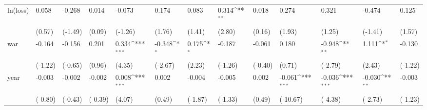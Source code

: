 \def\sym#1{\ifmmode^{#1}\else\(^{#1}\)\fi}
\begin{tabular}{p{1.5cm} p{1.7cm} p{1.7cm} p{1.7cm} p{1.7cm} p{1.7cm} p{1.7cm} p{1.7cm} p{1.7cm} p{1.7cm} p{1.7cm} p{1.7cm} p{1.7cm}}
\hline
ln(loss)        &    0.058         &   -0.268         &    0.014         &   -0.073         &    0.174         &    0.083         &    0.314\sym{**} &    0.018         &    0.274         &    0.321         &   -0.474         &    0.125         \\
                &   (0.57)         &  (-1.49)         &   (0.09)         &  (-1.26)         &   (1.76)         &   (1.41)         &   (2.80)         &   (0.16)         &   (1.93)         &   (1.25)         &  (-1.41)         &   (1.57)         \\
war             &   -0.164         &   -0.156         &    0.201         &    0.334\sym{***}&   -0.348\sym{*}  &    0.175\sym{*}  &   -0.187         &   -0.061         &    0.180         &   -0.948\sym{**} &    1.111\sym{*}  &   -0.130         \\
                &  (-1.22)         &  (-0.65)         &   (0.96)         &   (4.35)         &  (-2.67)         &   (2.23)         &  (-1.26)         &  (-0.40)         &   (0.71)         &  (-2.79)         &   (2.43)         &  (-1.22)         \\
year            &   -0.003         &   -0.002         &   -0.002         &    0.008\sym{***}&    0.002         &   -0.004         &   -0.005         &    0.002         &   -0.061\sym{***}&   -0.036\sym{***}&   -0.030\sym{**} &   -0.003         \\
                &  (-0.80)         &  (-0.43)         &  (-0.39)         &   (4.07)         &   (0.49)         &  (-1.87)         &  (-1.33)         &   (0.49)         & (-10.67)         &  (-4.38)         &  (-2.73)         &  (-1.23)         \\
\end{tabular}
\def\sym#1{\ifmmode^{#1}\else\(^{#1}\)\fi}

